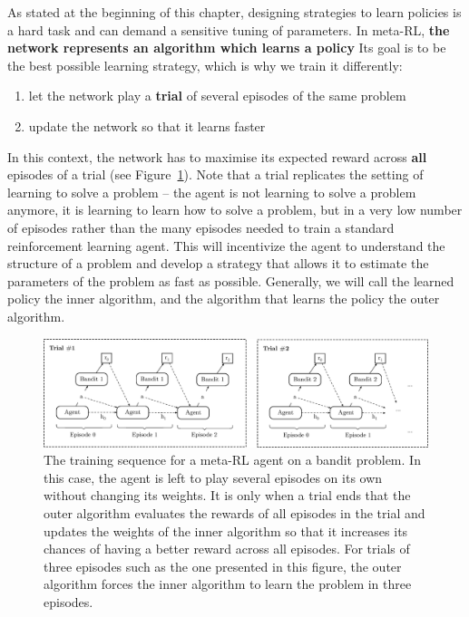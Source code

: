 As stated at the beginning of this chapter, designing strategies to learn
policies is a hard task and can demand a sensitive tuning of parameters.
In meta-RL, \textbf{the network represents an algorithm which learns a policy}
Its goal is to be the best possible learning strategy, which is why we train
it differently:
\begin{enumerate}
	\item let the network play a \textbf{trial}  of several
		episodes of the same problem
	\item update the network so that it learns faster
\end{enumerate}
In this context, the network has to maximise its expected reward across
\textbf{all} episodes of a trial (see 
Figure~\ref{fig:meta_bandit_training}). Note that a trial replicates the setting
of learning to solve a problem -- the agent is not learning to solve a 
problem anymore, it is learning to learn how to solve a problem, but in 
a very low number of episodes rather than the many episodes needed 
to train a standard reinforcement learning agent. This will incentivize the agent
to understand the structure of a problem and develop a strategy that allows it 
to estimate the parameters of the problem as fast as possible.
Generally, we will call the learned policy the inner 
algorithm, and the algorithm that learns the policy the outer algorithm.\\


\begin{figure}
	\centering
	\includegraphics[width=\linewidth]{fig/meta_bandit_training.eps}
	\caption{The training sequence for a meta-RL agent on a bandit problem.
	In this case, the agent is left to play several episodes on its own
	without changing its weights. It is only when a trial ends that the
	outer algorithm evaluates the rewards of all episodes in the trial and
	updates the weights of the inner algorithm so that it increases its
	chances of having a better reward across all episodes. For trials of 
	three episodes such as the one presented in this figure, the outer
	algorithm forces the inner algorithm to learn the problem in 
	three episodes.}
	\label{fig:meta_bandit_training}
\end{figure}

